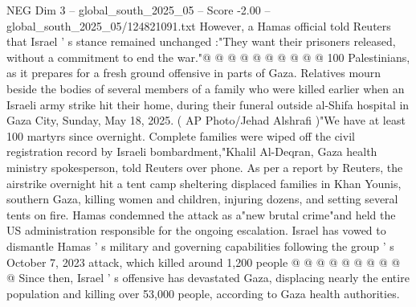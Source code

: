 \begin{textsample}{NEG Dim 3 – global\_south\_2025\_05 – Score -2.00 – global\_south\_2025\_05/124821091.txt}
However, a Hamas official told Reuters that Israel ' s stance remained unchanged :"They want their prisoners released, without a commitment to end the war."@ @ @ @ @ @ @ @ @ @ 100 Palestinians, as it prepares for a fresh ground offensive in parts of Gaza.
Relatives mourn beside the bodies of several members of a family who were killed earlier when an Israeli army strike hit their home, during their funeral outside al-Shifa hospital in Gaza City, Sunday, May 18, 2025. ( AP Photo/Jehad Alshrafi )"We have at least 100 martyrs since overnight.
Complete families were wiped off the civil registration record by Israeli bombardment,"Khalil Al-Deqran, Gaza health ministry spokesperson, told Reuters over phone.
As per a report by Reuters, the airstrike overnight hit a tent camp sheltering displaced families in Khan Younis, southern Gaza, killing women and children, injuring dozens, and setting several tents on fire.
Hamas condemned the attack as a"new brutal crime"and held the US administration responsible for the ongoing escalation.
Israel has vowed to dismantle Hamas ' s military and governing capabilities following the group ' s October 7, 2023 attack, which killed around 1,200 people @ @ @ @ @ @ @ @ @ @ Since then, Israel ' s offensive has devastated Gaza, displacing nearly the entire population and killing over 53,000 people, according to Gaza health authorities.

\end{textsample}
